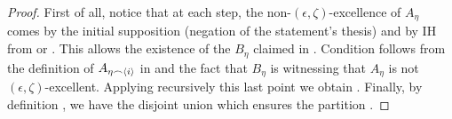 \begin{lemma}
\begin{proof}
                First of all, notice that at each step, the non-$(\epsilon, \zeta)$-excellence of $A_\eta$ comes by the initial supposition
                (negation of the statement's thesis) and by IH
                from  or .
                This allows the existence of the $B_\eta$ claimed in .
                Condition  follows from the definition of $A_{\eta \frown \left< i \right>}$ in
                 and the fact that $B_\eta$ is witnessing that $A_\eta$ is not $(\epsilon, \zeta)$-excellent.
                Applying recursively this last point we obtain .
                Finally, by definition , we have the disjoint union
                 which ensures
                the partition .


\end{proof}
\end{lemma}
